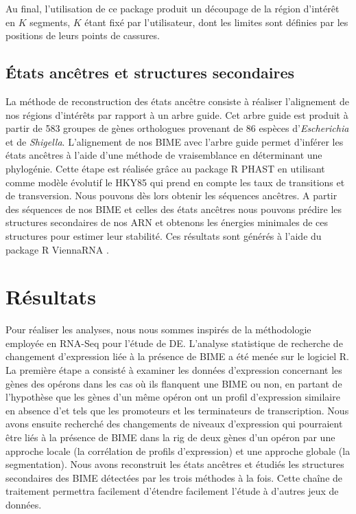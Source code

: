\documentclass[12pt,a4paper]{report}
\begin{document}
\begin{onehalfspace}
Au final, l'utilisation de ce package produit un découpage de la région d'intérêt en $K$ segments, $K$ étant fixé par l'utilisateur, dont les limites sont définies par les positions de leurs points de cassures.

\section*{États ancêtres et structures secondaires}
La méthode de reconstruction des états ancêtre consiste à réaliser l'alignement de nos régions d'intérêts par rapport à un arbre guide. Cet arbre guide est produit à partir de 583 groupes de gènes orthologues provenant de 86 espèces d'\textit{Escherichia} et de \textit{Shigella}. L'alignement de nos BIME avec l'arbre guide permet d'inférer les états ancêtres à l'aide d'une méthode de vraisemblance en déterminant une phylogénie. Cette étape est réalisée grâce au package R PHAST \citep{Hubisz2011} en utilisant comme modèle évolutif le HKY85 qui prend en compte les taux de transitions et de transversion. Nous pouvons dès lors obtenir les séquences ancêtres. A partir des séquences de nos BIME et celles des états ancêtres nous pouvons prédire les structures secondaires de nos ARN et obtenons les énergies minimales de ces structures pour estimer leur stabilité. Ces résultats sont générés à l'aide du package R ViennaRNA \citep{Lorenz2011}.

\chapter*{Résultats}

Pour réaliser les analyses, nous nous sommes inspirés de la méthodologie employée en RNA-Seq pour l'étude de DE. L'analyse statistique de recherche de changement d'expression liée à la présence de BIME a été menée sur le logiciel R. La première étape a consisté à examiner les données d'expression concernant les gènes des opérons dans les cas où ils flanquent une BIME ou non, en partant de l'hypothèse que les gènes d'un même opéron ont un profil d'expression similaire en absence d'\gls{et} tels que les promoteurs et les terminateurs de transcription. Nous avons ensuite recherché des changements de niveaux d'expression qui pourraient être liés à la présence de BIME dans la \gls{rig} de deux gènes d'un opéron par une approche locale (la corrélation de profils d'expression) et une approche globale (la segmentation). Nous avons reconstruit les états ancêtres et étudiés les structures secondaires des BIME détectées par les trois méthodes à la fois. Cette chaîne de traitement permettra facilement d'étendre facilement l'étude à d'autres jeux de données.


\end{onehalfspace}
\end{document}
